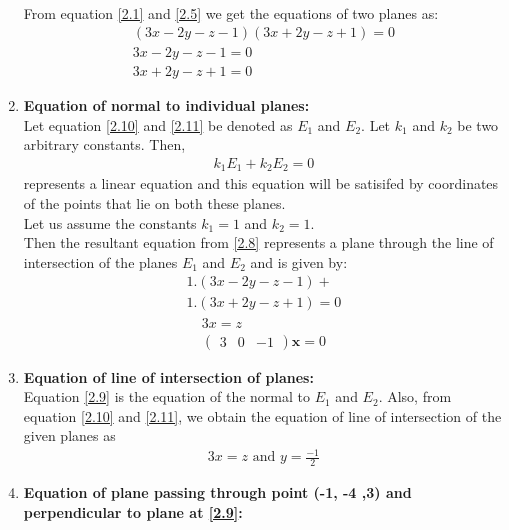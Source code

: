 \documentclass[journal,12pt,twocolumn]{IEEEtran}
\let\vec\mathbf
\numberwithin{equation}{subsection}
\newcommand{\myvec}[1]{\ensuremath{\begin{pmatrix}#1\end{pmatrix}}}
\begin{document}
\begin{enumerate}
\begin{align}
\end{align}
From equation \eqref{2.1} and \eqref{2.5} we get the equations of two planes as:
\begin{align}
   ( 3x- 2y -z -1)( 3x +2y-z +1 ) = 0 \label{2.6}\\
   3x- 2y -z -1 = 0  \label{2.10} \\
 3x +2y-z +1  = 0 \label{2.11}
\end{align}
\item \textbf{Equation of normal to individual planes:}\\
Let equation \eqref {2.10} and \eqref{2.11} be denoted as $E_{1 }$ and $ E_{2}$. Let $ k_{1}$ and $k_{2}$ be two arbitrary constants. Then,
 \begin{align}
   k_{1}E_{1} + k_{2}E_{2} = 0\label{2.8}
\end{align}
represents a linear equation and this equation will be satisifed by coordinates of the points that lie on both these planes.\\
 Let us assume the constants $ k_{1} = 1$  and $k_{2} = 1$.\\
Then the resultant equation from \eqref{2.8} represents a plane through the line of intersection of the planes $E_{1}$ and $E_{2}$ and is given by:
\begin{multline}
   1.(3x- 2y -z -1) + \\1.( 3x +2y-z +1 ) =0
\end{multline}
\begin{align}
  3x = z\\ 
\myvec{3& 0& -1} \vec{x} = 0   \label{2.9}
\end{align}
\item \textbf{Equation of line of intersection of planes:}\\
Equation \eqref {2.9} is the equation of the normal to  $E_{1}$ and $E_{2}$. Also, from equation \eqref{2.10} and     \eqref {2.11}, we obtain the equation of line of intersection of the given planes  as
\begin{align}
   3x = z \text{ and } y =\frac{-1}{2}\label{2.16}
\end{align}
\item \textbf{Equation of plane passing through point (-1, -4 ,3) and perpendicular to plane at \eqref{2.9}:}\\


\end{enumerate}
\end{document}
